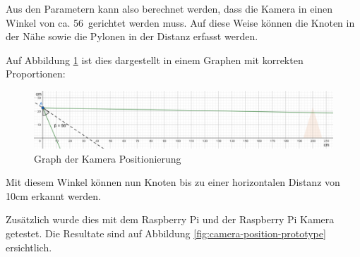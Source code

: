 Aus den Parametern kann also berechnet werden, dass die Kamera in einen Winkel von ca. 56\textdegree\ gerichtet werden muss. Auf diese Weise können die Knoten in der Nähe sowie die Pylonen in der Distanz erfasst werden.

Auf Abbildung \ref{fig:camera-position-exact} ist dies dargestellt in einem Graphen mit korrekten Proportionen:

\begin{figure}[H]
    \centering
    \includegraphics[width=1\linewidth]{assets/informatik-prototyp/camera/camera_position_exact_bigger.png}
    \caption{Graph der Kamera Positionierung}
    \label{fig:camera-position-exact}
\end{figure}

Mit diesem Winkel können nun Knoten bis zu einer horizontalen Distanz von 10cm erkannt werden.

Zusätzlich wurde dies mit dem Raspberry Pi und der Raspberry Pi Kamera getestet. Die Resultate sind auf Abbildung \ref{fig:camera-position-prototype} ersichtlich.


